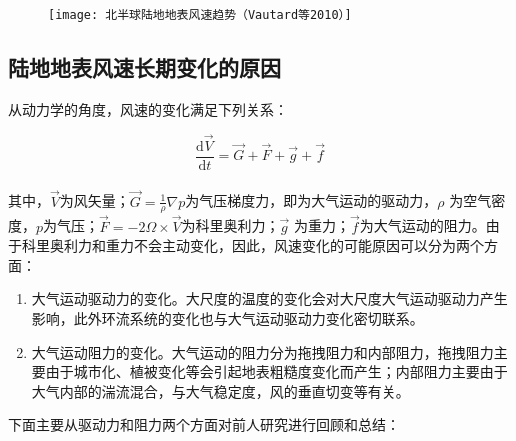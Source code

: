 \begin{figure}[!htbp]
    \centering
    \texttt{[image: 北半球陆地地表风速趋势（Vautard等2010）]}
    \label{fig:NHwindtrendVautard2010}
\end{figure}

\subsection{陆地地表风速长期变化的原因}

从动力学的角度，风速的变化满足下列关系：

\begin{equation}\label{eq:winddynmaic}
\frac{\mathrm{d} \vec{V}}{\mathrm{d} t} = \vec{G} + \vec{F} + \vec{g} + \vec{f}
\end{equation} ~\\
其中，$\vec{V}$为风矢量；$\vec{G} =\frac{1}{\rho} \nabla p $为气压梯度力，即为大气运动的驱动力，$\rho$ 为空气密度，$ p $为气压；$\vec{F} =-2 \Omega \times \vec{V} $为科里奥利力；$\vec{g}$ 为重力；$\vec{f}$为大气运动的阻力。由于科里奥利力和重力不会主动变化，因此，风速变化的可能原因可以分为两个方面：

\begin{enumerate}
 \item 大气运动驱动力的变化。大尺度的温度的变化会对大尺度大气运动驱动力产生影响，此外环流系统的变化也与大气运动驱动力变化密切联系。
 \item 大气运动阻力的变化。大气运动的阻力分为拖拽阻力和内部阻力，拖拽阻力主要由于城市化、植被变化等会引起地表粗糙度变化而产生；内部阻力主要由于大气内部的湍流混合，与大气稳定度，风的垂直切变等有关。
\end{enumerate}

下面主要从驱动力和阻力两个方面对前人研究进行回顾和总结：

